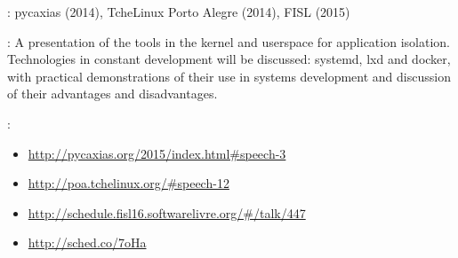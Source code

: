 \begin{description}[noitemsep]
    \item[Events]: pycaxias (2014), TcheLinux Porto Alegre (2014), FISL (2015)
    \item[Summary]:
        A presentation of the tools in the kernel and userspace for application
        isolation. Technologies in constant development will be discussed:
        systemd, lxd and docker, with practical demonstrations of their use in
        systems development and discussion of their advantages and
        disadvantages.
    \item[Websites]:
        \begin{itemize}[noitemsep]
            \item \url{http://pycaxias.org/2015/index.html#speech-3}
            \item \url{http://poa.tchelinux.org/#speech-12}
            \item \url{http://schedule.fisl16.softwarelivre.org/#/talk/447}
            \item \url{http://sched.co/7oHa}
        \end{itemize}
\end{description}
